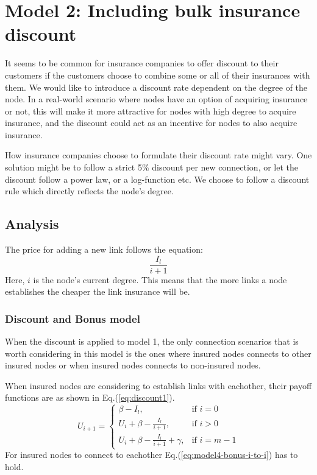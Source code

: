 \section{Model 2: Including bulk insurance discount}

 It seems to be common for insurance companies to offer discount to their customers if the customers choose to combine some or all of their insurances with them. We would like to introduce a discount rate dependent on the degree of the node. In a real-world scenario where nodes have an option of acquiring insurance or not, this will make it more attractive for nodes with high degree to acquire insurance, and the discount could act as an incentive for nodes to also acquire insurance. 

How insurance companies choose to formulate their discount rate might vary. One solution might be to follow a strict 5$\%$ discount per new connection, or let the discount follow a power law, or a log-function etc. We choose to follow a discount rule which directly reflects the node's degree.

\subsection{Analysis}
The price for adding a new link follows the equation:
\begin{equation}
\frac{I_{l}}{i+1}
\label{eq:discount0}
\end{equation}
Here, $i$ is the node's current degree. This means that the more links a node establishes the cheaper the link insurance will be. 

\subsubsection{Discount and Bonus model}

When the discount is applied to model 1, the only connection scenarios that is worth considering in this model is the ones where insured nodes connects to other insured nodes or when insured nodes connects to non-insured nodes.

When insured nodes are considering to establish links with eachother, their payoff functions are as shown in Eq.(\ref{eq:discount1}).  
\begin{equation}
    U_{i+1}= 
\begin{cases}
    \beta - I_{l},& \text{if } i = 0\\
    U_{i}+\beta -\frac{I_{l}}{i+1},& \text{if }  i>0\\
    U_{i}+\beta -\frac{I_{l}}{i+1}+\gamma,& \text{if } i=m-1
\end{cases}
\label{eq:discount1}
\end{equation}
For insured nodes to connect to eachother Eq.(\ref{eq:model4-bonus-i-to-i}) has to hold.

